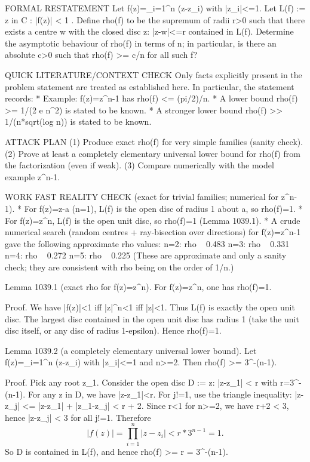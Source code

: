 FORMAL RESTATEMENT
Let f(z)=\prod_{i=1}^n (z-z_i) with |z_i|<=1. Let
  L(f) := { z in C : |f(z)| < 1 }.
Define rho(f) to be the supremum of radii r>0 such that there exists a centre w with the closed disc {z: |z-w|<=r} contained in L(f).
Determine the asymptotic behaviour of rho(f) in terms of n; in particular, is there an absolute c>0 such that rho(f) >= c/n for all such f?

QUICK LITERATURE/CONTEXT CHECK
Only facts explicitly present in the problem statement are treated as established here. In particular, the statement records:
* Example: f(z)=z^n-1 has rho(f) <= (pi/2)/n.
* A lower bound rho(f) >= 1/(2 e n^2) is stated to be known.
* A stronger lower bound rho(f) >> 1/(n*sqrt(log n)) is stated to be known.

ATTACK PLAN
(1) Produce exact rho(f) for very simple families (sanity check).
(2) Prove at least a completely elementary universal lower bound for rho(f) from the factorization (even if weak).
(3) Compare numerically with the model example z^n-1.

WORK
FAST REALITY CHECK (exact for trivial families; numerical for z^n-1).
* For f(z)=z-a (n=1), L(f) is the open disc of radius 1 about a, so rho(f)=1.
* For f(z)=z^n, L(f) is the open unit disc, so rho(f)=1 (Lemma 1039.1).
* A crude numerical search (random centres + ray-bisection over directions) for f(z)=z^n-1 gave the following approximate rho values:
  n=2: rho ~ 0.483
  n=3: rho ~ 0.331
  n=4: rho ~ 0.272
  n=5: rho ~ 0.225
  (These are approximate and only a sanity check; they are consistent with rho being on the order of 1/n.)

Lemma 1039.1 (exact rho for f(z)=z^n).
For f(z)=z^n, one has rho(f)=1.

Proof.
We have |f(z)|<1 iff |z|^n<1 iff |z|<1. Thus L(f) is exactly the open unit disc. The largest disc contained in the open unit disc has radius 1 (take the unit disc itself, or any disc of radius 1-epsilon). Hence rho(f)=1.

Lemma 1039.2 (a completely elementary universal lower bound).
Let f(z)=\prod_{i=1}^n (z-z_i) with |z_i|<=1 and n>=2. Then rho(f) >= 3^{-(n-1)}.

Proof.
Pick any root z_1. Consider the open disc D := {z: |z-z_1| < r} with r=3^{-(n-1)}.
For any z in D, we have |z-z_1|<r. For j!=1, use the triangle inequality:
  |z-z_j| <= |z-z_1| + |z_1-z_j| < r + 2.
Since r<1 for n>=2, we have r+2 < 3, hence |z-z_j| < 3 for all j!=1.
Therefore
\[
  |f(z)| = \prod_{i=1}^n |z-z_i| < r * 3^{n-1} = 1.
\]
So D is contained in L(f), and hence rho(f) >= r = 3^{-(n-1)}.

